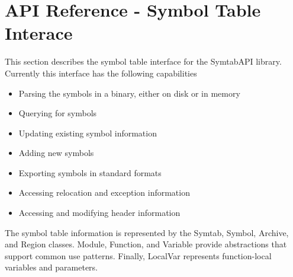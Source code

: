 \section{API Reference - Symbol Table Interace}

This section describes the symbol table interface for the SymtabAPI library. Currently this interface has the following capabilities
\begin{itemize}
    \item Parsing the symbols in a binary, either on disk or in memory 
    \item Querying for symbols 
    \item Updating existing symbol information
    \item Adding new symbols 
    \item Exporting symbols in standard formats
    \item Accessing relocation and exception information
    \item Accessing and modifying header information
\end{itemize}

The symbol table information is represented by the Symtab, Symbol, Archive, and Region classes. Module, Function, and Variable provide abstractions that support common use patterns. Finally, LocalVar represents function-local variables and parameters. 











